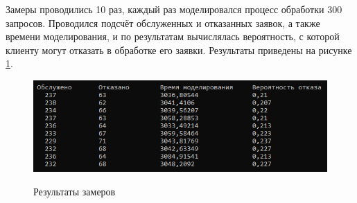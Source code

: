 Замеры проводились 10 раз, каждый раз моделировался процесс обработки 300 запросов. Проводился подсчёт обслуженных и отказанных заявок, а также времени моделирования, и по результатам вычислялась вероятность, с которой клиенту могут отказать в обработке его заявки. Результаты приведены на рисунке \ref{fig3:image}.

\begin{figure}[h]
	\begin{center}
		{\includegraphics[scale = 0.9]{img/results.png}}
		\caption{Результаты замеров}
		\label{fig3:image}
	\end{center}
\end{figure}